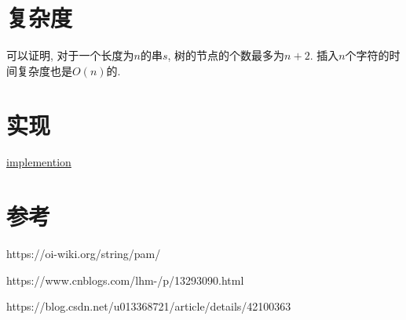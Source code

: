 \documentclass{article}
\begin{document}
\section{复杂度}
可以证明, 对于一个长度为$n$的串$s$, 树的节点的个数最多为$n+2$. 插入$n$个字符的时间复杂度也是$O(n)$的.

\section{实现}
\href{https://github.com/19891101/algorithm/blob/master/string/palindromic-tree/pa_tree.h}{implemention} 


\section{参考}
https://oi-wiki.org/string/pam/ \par
https://www.cnblogs.com/lhm-/p/13293090.html \par
https://blog.csdn.net/u013368721/article/details/42100363 \par
\end{document}
